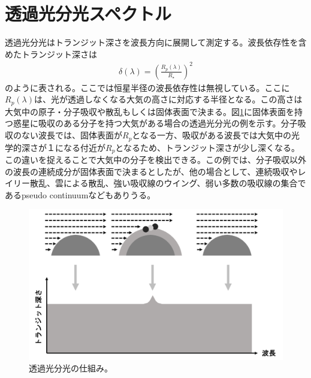 \section{透過光分光スペクトル}

透過光分光はトランジット深さを波長方向に展開して測定する。波長依存性を含めたトランジット深さは
\begin{align}
\delta (\lambda) = \left( \frac{R_p(\lambda)}{R_\star} \right)^2
\end{align}
のように表される。ここでは恒星半径の波長依存性は無視している。ここに$R_p(\lambda)$は、光が透過しなくなる大気の高さに対応する半径となる。この高さは大気中の原子・分子吸収や散乱もしくは固体表面で決まる。図\ref{fig:transmission}に固体表面を持つ惑星に吸収のある分子を持つ大気がある場合の透過光分光の例を示す。分子吸収のない波長では、固体表面が$R_p$となる一方、吸収がある波長では大気中の光学的深さが１になる付近が$R_p$となるため、トランジット深さが少し深くなる。この違いを捉えることで大気中の分子を検出できる。この例では、分子吸収以外の波長の連続成分が固体表面で決まるとしたが、他の場合として、連続吸収やレイリー散乱、雲による散乱、強い吸収線のウイング、弱い多数の吸収線の集合であるpseudo continuumなどもありうる。

\begin{figure}[htb]
\begin{center}
\includegraphics[width=\linewidth]{fig/transmission.png}
\caption{透過光分光の仕組み。\label{fig:transmission}}
\end{center}
\end{figure}

